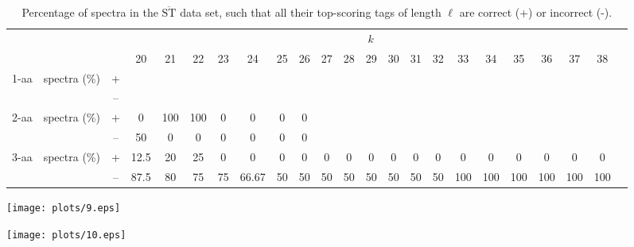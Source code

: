 \documentclass{article}
\def\STbar{{\overline{\mathrm{ST}}}}
\begin{document}
\begin{table}[ht]\footnotesize
\vspace{3mm}
{\centering
\begin{center}
\begin{tabular}{|c|cc|c|c|c|c|c|c|c|c|c|c|c|c|c|c|c|c|c|c|c|c|}
  \hline
  \multicolumn{3}{|c|}{ } & \multicolumn{ 19}{|c|}{$k$} \\
  \cline{4-22 }
  \multicolumn{3}{|c|}{ } 
 & 20 & 21 & 22 & 23 & 24 & 25 & 26 & 27 & 28 & 29 & 30 & 31 & 32 & 33 & 34 & 35 & 36 & 37 & 38\\
\hline
  \multirow{2}{*}{1-aa}& \multirow{2}{*}{spectra (\%)}  &  +
 &  &  &  &  &  &  &  &  &  &  &  &  &  &  &  &  &  &  & \\
 & 
 &  --
 &  &  &  &  &  &  &  &  &  &  &  &  &  &  &  &  &  &  & \\
\hline
  \multirow{2}{*}{2-aa}& \multirow{2}{*}{spectra (\%)}  &  +
 & 0 & 100 & 100 & 0 & 0 & 0 & 0 &  &  &  &  &  &  &  &  &  &  &  & \\
 & 
 &  --
 & 50 & 0 & 0 & 0 & 0 & 0 & 0 &  &  &  &  &  &  &  &  &  &  &  & \\
\hline
  \multirow{2}{*}{3-aa}& \multirow{2}{*}{spectra (\%)}  &  +
 & 12.5 & 20 & 25 & 0 & 0 & 0 & 0 & 0 & 0 & 0 & 0 & 0 & 0 & 0 & 0 & 0 & 0 & 0 & 0\\
 & 
 &  --
 & 87.5 & 80 & 75 & 75 & 66.67 & 50 & 50 & 50 & 50 & 50 & 50 & 50 & 50 & 100 & 100 & 100 & 100 & 100 & 100 \\
  \hline
\end{tabular}
\end{center}
\par}
\centering

\caption{Percentage of spectra in the $\STbar$ data set, such that all their top-scoring tags of length $\ell$ are correct (+) or incorrect (-).}

\vspace{3mm}
\label{table:all-top-scoring}
\end{table}
\texttt{[image: plots/9.eps]}

\texttt{[image: plots/10.eps]}
\end{document}
